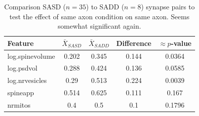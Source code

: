 \documentclass[12pt]{article}
\theoremstyle{definition}
\begin{document}






\begin{table}[tb]
  \caption{Comparison SASD ($n=35$) to SADD ($n=8$) synapse pairs to test the effect of same axon condition on same axon. Seems somewhat significant again. }
  \label{tab:dasdVSdadd}
  \begin{center}
    \begin{tabular}{l|cccc}
    \hline

    \hline
Feature                  & $\bar{X}_{SASD}$ & $\bar{X}_{SADD}$ & Difference & $\approx p$-value  \\
    \hline
log.spinevolume & 0.202 & 0.345 & 0.144 & 0.0364 \\ 
log.psdvol & 0.288 & 0.424 & 0.136 & 0.0585 \\ 
log.nrvesicles & 0.29 & 0.513 & 0.224 & 0.0039 \\ 
spineapp & 0.514 & 0.625 & 0.111 & 0.167 \\ 
nrmitos & 0.4 & 0.5 & 0.1 & 0.1796 \\ 
    \hline
    \end{tabular}
  \end{center}
\end{table}
\end{document}
